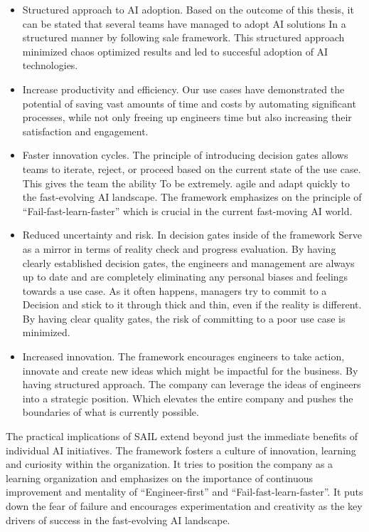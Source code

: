 \documentclass[]{imc-inf}
\begin{document}
\begin{itemize}
	\item
	Structured approach to AI adoption. Based on the outcome of this thesis, it can be stated that several teams have managed to adopt AI solutions In a structured manner by following sale framework. This structured approach minimized chaos optimized results and led to succesful adoption of AI technologies.
	\item
	Increase productivity and efficiency. Our use cases have demonstrated the potential of saving vast amounts of time and costs by automating significant processes, while not only freeing up engineers time but also increasing their satisfaction and engagement.
	
	\item
	Faster innovation cycles. The principle of introducing decision gates allows teams to iterate, reject, or proceed based on the current state of the use case. This gives the team the ability To be extremely. agile and adapt quickly to the fast-evolving AI landscape. The framework emphasizes on the principle of ``Fail-fast-learn-faster'' which is crucial in the current fast-moving AI world.
	
	\item
	Reduced uncertainty and risk. In decision gates inside of the framework Serve as a mirror in terms of reality check and progress evaluation. By having clearly established decision gates, the engineers and management are always up to date and are completely eliminating any personal biases and feelings towards a use case. As it often happens, managers try to commit to a Decision and stick to it through thick and thin, even if the reality is different. By having clear quality gates, the risk of committing to a poor use case is minimized.
	\item
	Increased innovation. The framework encourages engineers to take action, innovate and create new ideas which might be impactful for the business. By having structured approach. The company can leverage the ideas of engineers into a strategic position. Which elevates the entire company and pushes the boundaries of what is currently possible. 
\end{itemize}


The practical implications of SAIL extend beyond just the immediate
benefits of individual AI initiatives. The framework fosters a culture
of innovation, learning and curiosity within the organization. It tries
to position the company as a learning organization and emphasizes on the
importance of continuous improvement and mentality of ``Engineer-first''
and ``Fail-fast-learn-faster''. It puts down the fear of failure and
encourages experimentation and creativity as the key drivers of success
in the fast-evolving AI landscape.
\end{document}
